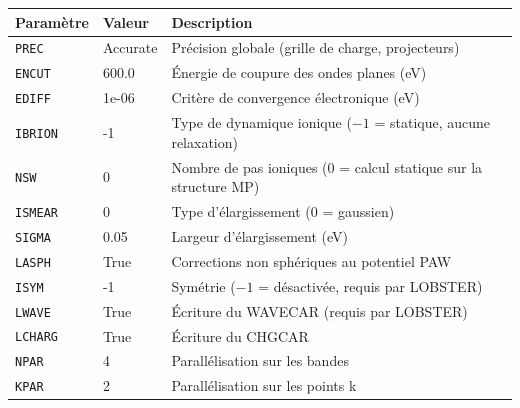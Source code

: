 \begin{tabular}{@{}l l p{7.5cm}@{}}
\toprule
Param\`etre & Valeur & Description \\
\midrule
\texttt{PREC} & Accurate & Pr\'ecision globale (grille de charge, projecteurs) \\
\texttt{ENCUT} & 600.0 & \'Energie de coupure des ondes planes (eV) \\
\texttt{EDIFF} & 1e-06 & Crit\`ere de convergence \'electronique (eV) \\
\texttt{IBRION} & -1 & Type de dynamique ionique ($-1$ = statique, aucune relaxation) \\
\texttt{NSW} & 0 & Nombre de pas ioniques (0 = calcul statique sur la structure MP) \\
\texttt{ISMEAR} & 0 & Type d'\'elargissement ($0$ = gaussien) \\
\texttt{SIGMA} & 0.05 & Largeur d'\'elargissement (eV) \\
\texttt{LASPH} & True & Corrections non sph\'eriques au potentiel PAW \\
\texttt{ISYM} & -1 & Sym\'etrie ($-1$ = d\'esactiv\'ee, requis par LOBSTER) \\
\texttt{LWAVE} & True & \'Ecriture du WAVECAR (requis par LOBSTER) \\
\texttt{LCHARG} & True & \'Ecriture du CHGCAR \\
\texttt{NPAR} & 4 & Parall\'elisation sur les bandes \\
\texttt{KPAR} & 2 & Parall\'elisation sur les points k \\
\bottomrule
\end{tabular}